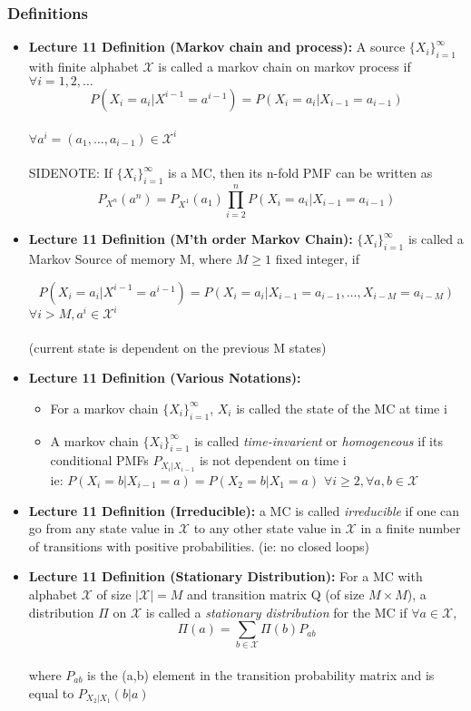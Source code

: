 \documentclass{article}
\begin{document}
\subsubsection{Definitions}
\begin{itemize}
    \item \textbf{Lecture 11 Definition (Markov chain and process):} A source \(\{X_i\}_{i=1}^\infty\) with finite alphabet \(\mathcal{X}\) is called a markov chain on markov process if \(\forall i = 1, 2, \ldots\)
    \[P(X_i=a_i | X^{i-1} = a^{i-1}) = P(X_i = a_i | X_{i-1} = a_{i-1})\]
    \\ \(\forall a^i = (a_1, \ldots, a_{i-1}) \in \mathcal{X}^i\)
    \\ \\
    SIDENOTE: If \(\{X_i\}_{i=1}^\infty\) is a MC, then its n-fold PMF can be written as \\
    \[P_{X^n}(a^n) = P_{X^1}(a_1) \prod_{i=2}^n P(X_i=a_i|X_{i-1}=a_{i-1})\]
    
    \item \textbf{Lecture 11 Definition (M'th order Markov Chain):} \(\{X_i\}_{i=1}^\infty\) is called a Markov Source of memory M, where \(M\geq 1\) fixed integer, if
    
    \[P(X_i=a_i|X^{i-1} = a^{i-1}) =P(X_i=a_i|X_{i-1} = a_{i-1}, \ldots, X_{i-M} = a_{i-M})\]
    \(\forall i>M, a^i \in \mathcal{X}^i\)
    \\ \\ (current state is dependent on the previous M states)
    \item \textbf{Lecture 11 Definition (Various Notations):}
    \begin{itemize}
        \item For a markov chain \(\{X_i\}^\infty_{i=1}\), \(X_i\) is called the state of the MC at time i
        \item A markov chain \(\{X_i\}^\infty_{i=1}\) is called \textit{time-invarient} or \textit{homogeneous} if its conditional PMFs \(P_{X_i|X_{i-1}}\) is not dependent on time i
        \\ ie: \(P(X_i = b| X_{i-1} = a) = P(X_2=b|X_1=a)\)  \(\forall i\geq 2, \forall a,b \in \mathcal{X}\)
    \end{itemize}
    \item \textbf{Lecture 11 Definition (Irreducible):} a MC is called \textit{irreducible} if one can go from any state value in \(\mathcal{X}\) to any other state value in \(\mathcal{X}\) in a finite number of transitions with positive probabilities. (ie: no closed loops)
    \item \textbf{Lecture 11 Definition (Stationary Distribution):} For a MC with alphabet \(\mathcal{X}\) of size \(|\mathcal{X}|=M\) and transition matrix Q (of size \(M \times M\)), a distribution \(\Pi\) on \(\mathcal{X}\) is called a \textit{stationary distribution}
    for the MC if \(\forall a \in \mathcal{X},\)
    \[\Pi (a) = \sum_{b \in \mathcal{X}} \Pi(b) P_{ab}\]
    \\ where \(P_{ab}\) is the (a,b) element in the transition probability matrix and is equal to \(P_{X_2|X_1}(b|a)\)

    
\end{itemize}
\end{document}
